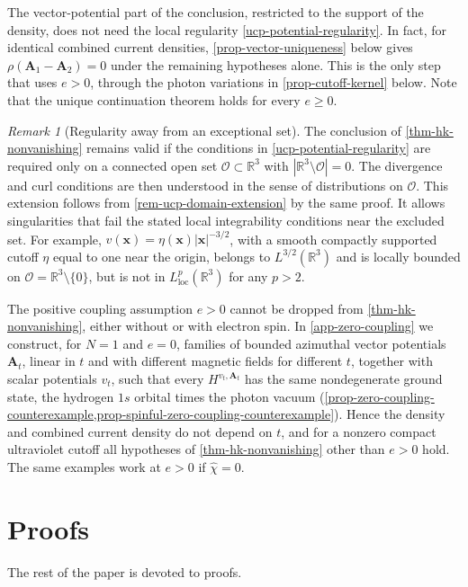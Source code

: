 \documentclass[final,reqno]{amsart}
\theoremstyle{remark}
\newtheorem{remark}{Remark}
\newcommand{\RR}{\mathbb{R}}
\newcommand{\vx}{\mathbf{x}}
\newcommand{\vA}{{\mathbf{A}}}
\newcommand{\wh}[1]{\widehat{#1}}
\begin{document}
The vector-potential part of the conclusion, restricted to the support
of the density, does not need the local regularity
\cref{ucp-potential-regularity}. In fact, for identical combined current
densities, \cref{prop-vector-uniqueness} below gives $\rho(\vA_1-\vA_2)=0$
under the remaining hypotheses alone.  This is the only step that uses $e>0$,
through the photon variations in \cref{prop-cutoff-kernel} below. Note that the
unique continuation theorem holds for every $e\geq0$.

\begin{remark}[Regularity away from an exceptional set]
\label{rem-ucp-open-set}
The conclusion of \cref{thm-hk-nonvanishing} remains valid if the
conditions in \cref{ucp-potential-regularity} are required only on a
connected open set $\mathcal O\subset\RR^3$ with
$|\RR^3\setminus\mathcal O|=0$.  The divergence and curl conditions are then
understood in the sense of distributions on $\mathcal O$.  This extension follows
from \cref{rem-ucp-domain-extension} by the same proof.  It allows singularities
that fail the stated local integrability conditions near the excluded
set.  For example, $v(\vx)=\eta(\vx)|\vx|^{-3/2}$, with a smooth
compactly supported cutoff $\eta$ equal to one near the origin, belongs
to $L^{3/2}(\RR^3)$ and is locally bounded on
$\mathcal O=\RR^3\setminus\{0\}$, but is not in
$L^p_\mathrm{loc}(\RR^3)$ for any $p>2$.
\end{remark}

The positive coupling assumption $e>0$ cannot be dropped from
\cref{thm-hk-nonvanishing}, either without or with electron spin.
In \cref{app-zero-coupling} we construct, for $N=1$ and $e=0$,
families of bounded azimuthal vector potentials $\vA_t$, linear in $t$
and with different magnetic fields for different $t$, together with
scalar potentials $v_t$, such that every $H^{v_t,\vA_t}$ has the same
nondegenerate ground state, the hydrogen $1s$ orbital times the photon
vacuum
(\cref{prop-zero-coupling-counterexample,prop-spinful-zero-coupling-counterexample}).
Hence the density and combined current density do not depend on $t$, and
for a nonzero compact ultraviolet cutoff all hypotheses of
\cref{thm-hk-nonvanishing} other than $e>0$ hold.  The same examples
work at $e>0$ if $\wh\chi=0$.

\section{Proofs}\label{sec-proofs}

The rest of the paper is devoted to proofs. 
\end{document}
